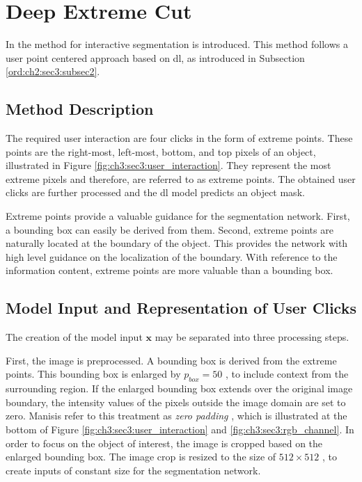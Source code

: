 
\section{Deep Extreme Cut}\label{ord:ch3:sec3}

In \cite{Man18-DEXTR} the  method for interactive segmentation is introduced.
This method follows a user point centered approach based on \gls{dl}, as introduced in Subsection \ref{ord:ch2:sec3:subsec2}.

\subsection{Method Description}\label{ord:ch3:sec3:subsec1}

The required user interaction are four clicks in the form of extreme points.
These points are the right-most, left-most, bottom, and top pixels of an object, illustrated in Figure \ref{fig:ch3:sec3:user_interaction}.
They represent the most extreme pixels and therefore, are referred to as extreme points.
The obtained user clicks are further processed and the \gls{dl} model predicts an object mask.

Extreme points provide a valuable guidance for the segmentation network.
First, a bounding box can easily be derived from them.
Second, extreme points are naturally located at the boundary of the object.
This provides the network with high level guidance on the localization of the boundary.
With reference to the information content, extreme points are more valuable than a bounding box.

\subsection{Model Input and Representation of User Clicks}\label{ord:ch3:sec3:subsec2}

The creation of the model input $\textbf{x}$ may be separated into three processing steps.

First, the image is preprocessed. 
A bounding box is derived from the extreme points. 
This bounding box is enlarged by $p_{{box}} = 50 $ , to include context from the surrounding region.
If the enlarged bounding box extends over the original image boundary, the intensity values of the pixels outside the image domain are set to zero.
Manisis \etal refer to this treatment as \textit{zero padding} \cite{Man18-DEXTR}, which is illustrated at the bottom of Figure \ref{fig:ch3:sec3:user_interaction} and \ref{fig:ch3:sec3:rgb_channel}.
In order to focus on the object of interest, the image is cropped based on the enlarged bounding box.
The image crop is resized to the size of $512 \times 512$ , to create inputs of constant size for the segmentation network.

